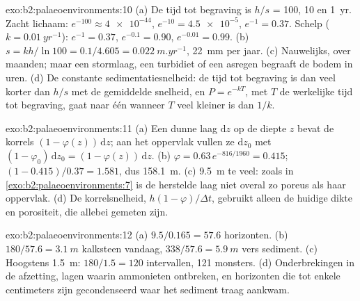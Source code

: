 \begin{solution}{exo:b2:palaeoenvironments:10}
(a) De tijd tot begraving is $h/s$ = 100, 10 en \qty{1}{yr}. Zacht lichaam: $e^{-100} \approx
\num{4e-44}$, $e^{-10} = \num{4.5e-5}$, $e^{-1} = 0.37$. Schelp ($k = \qty{0.01}{yr^{-1}}$):
$e^{-1} = 0.37$, $e^{-0.1} = 0.90$, $e^{-0.01} = 0.99$. (b) $s = kh/\ln 100 = 0.1/4.605 =
\qty{0.022}{m.yr^{-1}}$, \qty{22}{mm} per jaar. (c) Nauwelijks, over maanden; maar een stormlaag, een
turbidiet of een asregen begraaft de bodem in uren. (d) De constante sedimentatiesnelheid: de
tijd tot begraving is dan veel korter dan $h/s$ met de gemiddelde snelheid, en $P = e^{-kT}$, met $T$
de werkelijke tijd tot begraving, gaat naar één wanneer $T$ veel kleiner is dan $1/k$.
\end{solution}

\begin{solution}{exo:b2:palaeoenvironments:11}
(a) Een dunne laag $\mathrm dz$ op de diepte $z$ bevat de korrels $(1 - \varphi(z))\,\mathrm dz$;
aan het oppervlak vullen ze $\mathrm dz_0$ met $(1 - \varphi_0)\,\mathrm dz_0 = (1 -
\varphi(z))\,\mathrm dz$. (b) $\varphi = 0.63\,e^{-816/1960} = 0.415$; $(1 - 0.415)/0.37 =
1.581$, dus \qty{158.1}{m}. (c) \qty{9.5}{m} te veel: zoals in \cref{exo:b2:palaeoenvironments:7}
is de herstelde laag niet overal zo poreus als haar oppervlak. (d) De korrelsnelheid,
$h(1-\varphi)/\Delta t$, gebruikt alleen de huidige dikte en porositeit, die allebei gemeten zijn.
\end{solution}

\begin{solution}{exo:b2:palaeoenvironments:12}
(a) $9.5/0.165 = 57.6$ horizonten. (b) $180/57.6 = \qty{3.1}{m}$ kalksteen vandaag, $338/57.6 =
\qty{5.9}{m}$ vers sediment. (c) Hoogstens \qty{1.5}{m}: $180/1.5 = 120$ intervallen, 121
monsters. (d) Onderbrekingen in de afzetting, lagen waarin ammonieten ontbreken, en horizonten die tot
enkele centimeters zijn gecondenseerd waar het sediment traag aankwam.
\end{solution}


